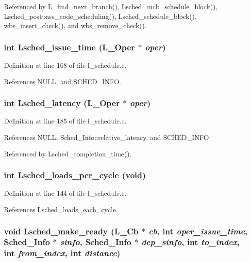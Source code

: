 Referenced by L\_\-find\_\-next\_\-branch(), Lsched\_\-mcb\_\-schedule\_\-block(), Lsched\_\-postpass\_\-code\_\-scheduling(), Lsched\_\-schedule\_\-block(), wbs\_\-insert\_\-check(), and wbs\_\-remove\_\-check().
\subsubsection{\setlength{\rightskip}{0pt plus 5cm}int Lsched\_\-issue\_\-time (L\_\-Oper $\ast$ {\em oper})}\label{l__schedule_8c_92dd48019f20a24c8bb797604f98568e}




Definition at line 168 of file l\_\-schedule.c.

References NULL, and SCHED\_\-INFO.
\subsubsection{\setlength{\rightskip}{0pt plus 5cm}int Lsched\_\-latency (L\_\-Oper $\ast$ {\em oper})}\label{l__schedule_8c_f5f80bb6ba0f18e8be67e0ec1be834c1}




Definition at line 185 of file l\_\-schedule.c.

References NULL, Sched\_\-Info::relative\_\-latency, and SCHED\_\-INFO.

Referenced by Lsched\_\-completion\_\-time().
\subsubsection{\setlength{\rightskip}{0pt plus 5cm}int Lsched\_\-loads\_\-per\_\-cycle (void)}\label{l__schedule_8c_374490810b4ebc38b10ce86b61d20241}




Definition at line 144 of file l\_\-schedule.c.

References Lsched\_\-loads\_\-each\_\-cycle.
\subsubsection{\setlength{\rightskip}{0pt plus 5cm}void Lsched\_\-make\_\-ready (L\_\-Cb $\ast$ {\em cb}, int {\em oper\_\-issue\_\-time}, \bf{Sched\_\-Info} $\ast$ {\em sinfo}, \bf{Sched\_\-Info} $\ast$ {\em dep\_\-sinfo}, int {\em to\_\-index}, int {\em from\_\-index}, int {\em distance})}\label{l__schedule_8c_afdc2e63f43924ffd008603f33e5f56a}




